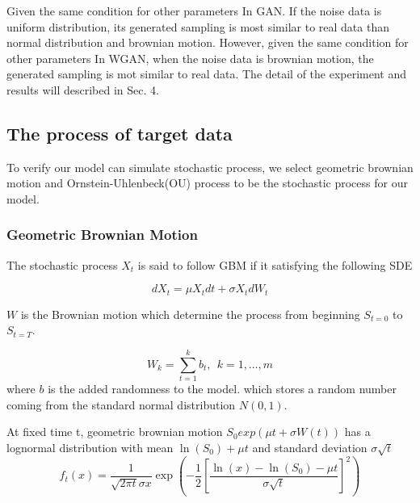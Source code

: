 \documentclass{article}
\begin{document}
	Given the same condition for other parameters In GAN. 
	If the noise data is uniform distribution, its generated sampling is most similar to real data than normal distribution and brownian motion.
	However, given the same condition for other parameters In WGAN, when the noise data is brownian motion, the generated sampling is mot similar to real data. 
	The detail of the experiment and results will described in Sec. 4.

	
	\subsection{The process of target data}
	
	To verify our model can simulate stochastic process, we select geometric brownian motion and Ornstein-Uhlenbeck(OU) process to be the stochastic process for our model.
	
	\subsubsection{Geometric Brownian Motion}
	
	The stochastic process $X_t$ is said to follow GBM if it satisfying the following SDE
	
	\begin{equation}
	dX_t = \mu X_tdt + \sigma X_t dW_t 
	\end{equation}
	
	$W$ is the Brownian motion which determine the process from beginning $S_{t=0}$ to $S_{t=T}$.
	
	\begin{equation}
	W_{k} = \sum_{t=1}^{k} b_{t}, \ \ k = 1, \dots, m
	\end{equation}
	where $b$ is the added randomness to the model.
	which stores a random number coming from the standard normal distribution $N(0, 1)$.
	
	At fixed time t, geometric brownian motion $S_{0}exp(\mu t + \sigma W(t))$ has a lognormal distribution with mean $\ln(S_{0})+\mu t$ and standard deviation $\sigma \sqrt{t}$
	\begin{equation}
	f_{t}(x) = \frac{1}{\sqrt{2 \pi t}\sigma x}\exp \left(-\frac{1}{2}\left[\frac{\ln(x)-\ln(S_{0})-\mu t}{\sigma \sqrt{t}}\right]^{2}\right)
	\label{eq: day_lognormal}
	\end{equation}
	
\end{document}

